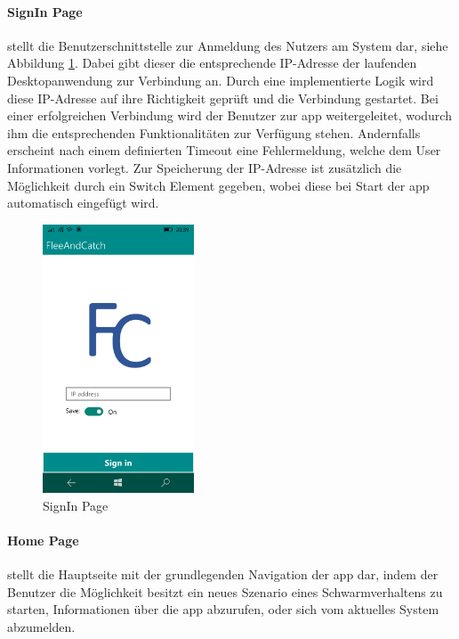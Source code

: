 \paragraph{SignIn Page} stellt die Benutzerschnittstelle zur Anmeldung des Nutzers am System dar, siehe Abbildung \ref{fig:signin}. Dabei gibt dieser die entsprechende IP-Adresse der laufenden Desktopanwendung zur Verbindung an. Durch eine implementierte Logik wird diese IP-Adresse auf ihre Richtigkeit geprüft und die Verbindung gestartet. Bei einer erfolgreichen Verbindung wird der Benutzer zur \gls{app} weitergeleitet, wodurch ihm die entsprechenden Funktionalitäten zur Verfügung stehen. Andernfalls erscheint nach einem definierten Timeout eine Fehlermeldung, welche dem User Informationen vorlegt. Zur Speicherung der IP-Adresse ist zusätzlich die Möglichkeit durch ein Switch Element gegeben, wobei diese bei Start der \gls{app} automatisch eingefügt wird.

\begin{figure}[h]
	\begin{center}
		\includegraphics[width=0.4\textwidth]{images/implementation/signin.png}
	\end{center}	
	\caption{SignIn Page}
	\label{fig:signin}
\end{figure}

\paragraph{Home Page} stellt die Hauptseite mit der grundlegenden Navigation der \gls{app} dar, indem der Benutzer die Möglichkeit besitzt ein neues Szenario eines Schwarmverhaltens zu starten, Informationen über die \gls{app} abzurufen, oder sich vom aktuelles System abzumelden.

